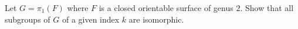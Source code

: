 Let $G=\pi_1(F)$ where $F$ is a closed orientable surface of genus
$2$. Show that all subgroups of $G$ of a given index $k$ are
isomorphic.
